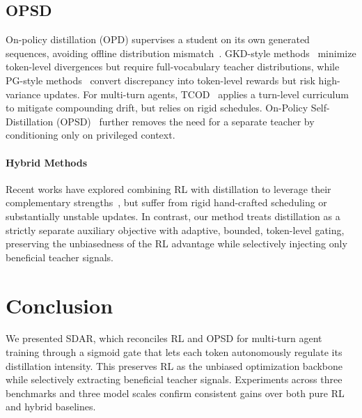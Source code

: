 \documentclass{llmxive}
\providecommand{\methodname}{\textsc{SDAR}\xspace}
\begin{document}
\subsection{OPSD}
  On-policy distillation (OPD) supervises a student on its own generated sequences, avoiding offline distribution mismatch~\citep{agarwal2024gkd,gu2026minillm}. GKD-style methods~\citep{agarwal2024gkd,wen2023fdivergence} minimize token-level divergences but require full-vocabulary teacher distributions, while PG-style methods~\citep{yang2026rlsd,xu2026tip} convert discrepancy into token-level rewards but risk high-variance updates. For multi-turn agents, TCOD~\citep{wang2026tcod} applies a turn-level curriculum to mitigate compounding drift, but relies on rigid schedules. On-Policy Self-Distillation (OPSD)~\citep{zhao2026opsd,he2026sdzero} further removes the need for a separate teacher by conditioning only on privileged context.
\paragraph{Hybrid Methods} Recent works have explored combining RL with distillation to leverage their complementary strengths~\citep{wang2026skillsd,yang2026rlsd,ding2026hdpo}, but suffer from rigid hand-crafted scheduling or substantially unstable updates. In contrast, our method treats distillation as a strictly separate auxiliary objective with adaptive, bounded, token-level gating, preserving the unbiasedness of the RL advantage while selectively injecting only beneficial teacher signals.


  \section{Conclusion}
  We presented \methodname{}, which reconciles RL and OPSD for multi-turn agent training through a sigmoid gate that lets each    
  token autonomously regulate its distillation intensity. This preserves RL as the unbiased optimization backbone while           
  selectively extracting beneficial teacher signals. Experiments across three benchmarks and three model scales confirm consistent
   gains over both pure RL and hybrid baselines.                                                                                 
\end{document}
